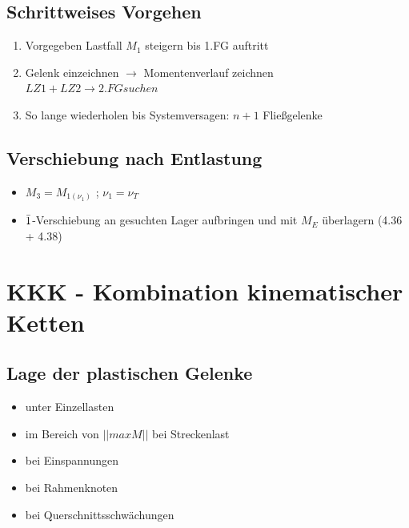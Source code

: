\documentclass[fleqn,twoside]{article}
\newcommand{\abs}[1]{\ensuremath{\left\vert#1\right\vert}}
\begin{document}
    \subsection{Schrittweises Vorgehen}
        \begin{enumerate}
            \item Vorgegeben Lastfall $M_1$ steigern bis 1.FG auftritt
            \item Gelenk einzeichnen $\rightarrow$ Momentenverlauf zeichnen\\
                    $LZ1+LZ2 \rightarrow 2.FG suchen$
            \item So lange wiederholen bis Systemversagen: $n+1$ Fließgelenke
        \end{enumerate}

    \subsection{Verschiebung nach Entlastung} 
        \begin{itemize}
            \item $M_3 = M_{1(\nu_1)}$ ; $\nu_1 = \nu_T$
            \item $\Bar{1}$-Verschiebung an gesuchten Lager aufbringen und mit $M_E$ überlagern (4.36 + 4.38)
        \end{itemize}
        
\section{KKK - Kombination kinematischer Ketten}

    \subsection{Lage der plastischen Gelenke}
        \begin{itemize}
            \item unter Einzellasten
            \item im Bereich von $\abs{\abs{maxM}}$ bei Streckenlast
            \item bei Einspannungen
            \item bei Rahmenknoten
            \item bei Querschnittsschwächungen
        \end{itemize}
\end{document}
